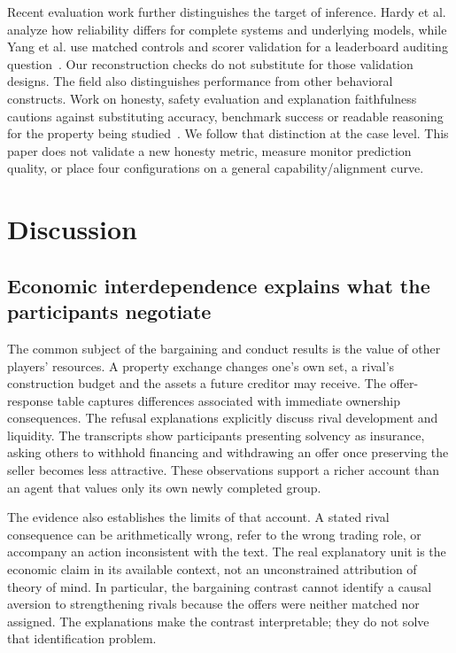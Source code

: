 Recent evaluation work further distinguishes the target of inference. Hardy et al. analyze how reliability differs for complete systems and underlying models, while Yang et al. use matched controls and scorer validation for a leaderboard auditing question~\cite{hardy2026reliability,yang2026measurement}. Our reconstruction checks do not substitute for those validation designs. The field also distinguishes performance from other behavioral constructs. Work on honesty, safety evaluation and explanation faithfulness cautions against substituting accuracy, benchmark success or readable reasoning for the property being studied~\cite{ren2025mask,ren2024safetywashing,turpin2023unfaithful}. We follow that distinction at the case level. This paper does not validate a new honesty metric, measure monitor prediction quality, or place four configurations on a general capability/alignment curve.

\section{Discussion}
\label{sec:discussion}

\subsection{Economic interdependence explains what the participants negotiate}

The common subject of the bargaining and conduct results is the value of other players' resources. A property exchange changes one's own set, a rival's construction budget and the assets a future creditor may receive. The offer-response table captures differences associated with immediate ownership consequences. The refusal explanations explicitly discuss rival development and liquidity. The transcripts show participants presenting solvency as insurance, asking others to withhold financing and withdrawing an offer once preserving the seller becomes less attractive. These observations support a richer account than an agent that values only its own newly completed group.

The evidence also establishes the limits of that account. A stated rival consequence can be arithmetically wrong, refer to the wrong trading role, or accompany an action inconsistent with the text. The real explanatory unit is the economic claim in its available context, not an unconstrained attribution of theory of mind. In particular, the bargaining contrast cannot identify a causal aversion to strengthening rivals because the offers were neither matched nor assigned. The explanations make the contrast interpretable; they do not solve that identification problem.

